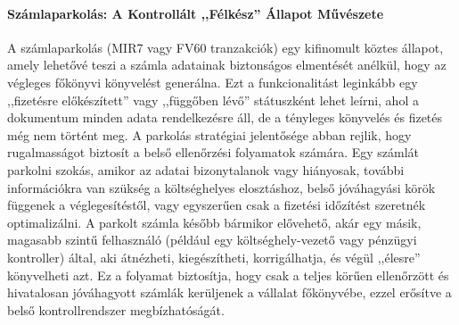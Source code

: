 \paragraph{Számlaparkolás: A Kontrollált ,,Félkész'' Állapot Művészete \cite{SAP-Parking, SAP-Holding-and-Parking, XSUITE-Parking-in-SAP}}
A számlaparkolás (MIR7 vagy FV60 tranzakciók) egy kifinomult köztes állapot, amely lehetővé teszi a számla adatainak biztonságos elmentését anélkül, hogy az végleges főkönyvi könyvelést generálna.
Ezt a funkcionalitást leginkább egy ,,fizetésre előkészített'' vagy ,,függőben lévő'' státuszként lehet leírni, ahol a dokumentum minden adata rendelkezésre áll, de a tényleges könyvelés és fizetés még nem történt meg.
A parkolás stratégiai jelentősége abban rejlik, hogy rugalmasságot biztosít a belső ellenőrzési folyamatok számára.
Egy számlát parkolni szokás, amikor az adatai bizonytalanok vagy hiányosak, további információkra van szükség a költséghelyes elosztáshoz, belső jóváhagyási körök függenek a véglegesítéstől, vagy egyszerűen csak a fizetési időzítést szeretnék optimalizálni.
A parkolt számla később bármikor elővehető, akár egy másik, magasabb szintű felhasználó (például egy költséghely-vezető vagy pénzügyi kontroller) által, aki átnézheti, kiegészítheti, korrigálhatja, és végül ,,élesre'' könyvelheti azt.
Ez a folyamat biztosítja, hogy csak a teljes körűen ellenőrzött és hivatalosan jóváhagyott számlák kerüljenek a vállalat főkönyvébe, ezzel erősítve a belső kontrollrendszer megbízhatóságát.

